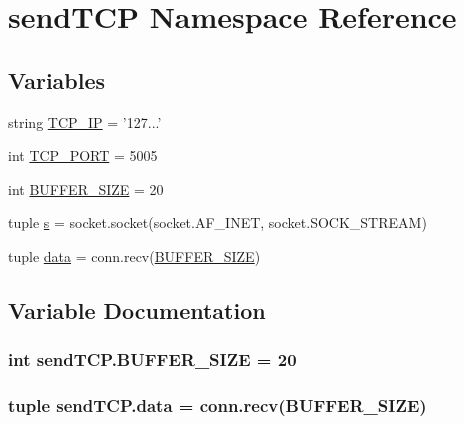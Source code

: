 \hypertarget{namespacesendTCP}{}\section{send\+T\+C\+P Namespace Reference}
\label{namespacesendTCP}
\subsection*{Variables}
\begin{DoxyCompactItemize}
\item 
string \hyperlink{namespacesendTCP_a4c20a021b7b8335700a990879a244f5a}{T\+C\+P\+\_\+\+I\+P} = '127...'
\item 
int \hyperlink{namespacesendTCP_a85e52e04bea6e2e3f50a576d03da6f6a}{T\+C\+P\+\_\+\+P\+O\+R\+T} = 5005
\item 
int \hyperlink{namespacesendTCP_a99b89f46ededc222d1b3950c1a0aae42}{B\+U\+F\+F\+E\+R\+\_\+\+S\+I\+Z\+E} = 20
\item 
tuple \hyperlink{namespacesendTCP_aac7d36265acf097cb58b7f7fbe733135}{s} = socket.\+socket(socket.\+A\+F\+\_\+\+I\+N\+E\+T, socket.\+S\+O\+C\+K\+\_\+\+S\+T\+R\+E\+A\+M)
\item 
tuple \hyperlink{namespacesendTCP_a1676de1499701c1fb04d0b1a42309125}{data} = conn.\+recv(\hyperlink{namespacesendTCP_a99b89f46ededc222d1b3950c1a0aae42}{B\+U\+F\+F\+E\+R\+\_\+\+S\+I\+Z\+E})
\end{DoxyCompactItemize}


\subsection{Variable Documentation}
\hypertarget{namespacesendTCP_a99b89f46ededc222d1b3950c1a0aae42}{}
\subsubsection[{B\+U\+F\+F\+E\+R\+\_\+\+S\+I\+Z\+E}]{\setlength{\rightskip}{0pt plus 5cm}int send\+T\+C\+P.\+B\+U\+F\+F\+E\+R\+\_\+\+S\+I\+Z\+E = 20}\label{namespacesendTCP_a99b89f46ededc222d1b3950c1a0aae42}
\hypertarget{namespacesendTCP_a1676de1499701c1fb04d0b1a42309125}{}
\subsubsection[{data}]{\setlength{\rightskip}{0pt plus 5cm}tuple send\+T\+C\+P.\+data = conn.\+recv({\bf B\+U\+F\+F\+E\+R\+\_\+\+S\+I\+Z\+E})}\label{namespacesendTCP_a1676de1499701c1fb04d0b1a42309125}
\hypertarget{namespacesendTCP_aac7d36265acf097cb58b7f7fbe733135}{}
